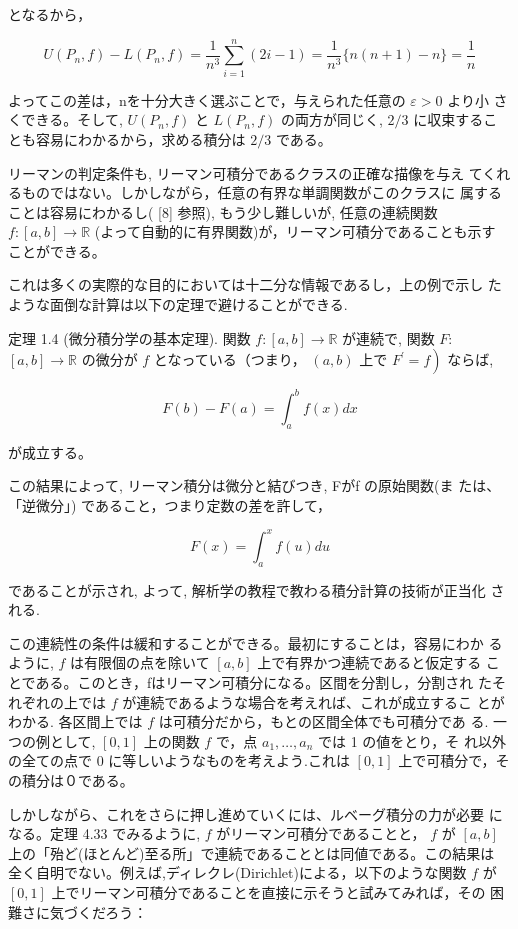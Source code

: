 \documentclass[14pt]{jsarticle}
\begin{document}
となるから，

$$
U\left(P_{n}, f\right)-L\left(P_{n}, f\right)=\frac{1}{n^{3}} \sum_{i=1}^{n}(2 i-1)=\frac{1}{n^{3}}\{n(n+1)-n\}=\frac{1}{n}
$$

よってこの差は，nを十分大きく選ぶことで，与えられた任意の $\varepsilon>0$ より小 さくできる。そして, $U\left(P_{n}, f\right)$ と $L\left(P_{n}, f\right)$ の両方が同じく, $2 / 3$ に収束するこ とも容易にわかるから，求める積分は $2 / 3$ である。

リーマンの判定条件も, リーマン可積分であるクラスの正確な描像を与え てくれるものではない。しかしながら，任意の有界な単調関数がこのクラスに 属することは容易にわかるし( [8] 参照), もう少し難しいが, 任意の連続関数 $f:[a, b] \rightarrow \mathbb{R}$ (よって自動的に有界関数)が，リーマン可積分であることも示す ことができる。

これは多くの実際的な目的においては十二分な情報であるし，上の例で示し たような面倒な計算は以下の定理で避けることができる.

定理 1.4 (微分積分学の基本定理). 関数 $f:[a, b] \rightarrow \mathbb{R}$ が連続で, 関数 $F:$ $[a, b] \rightarrow \mathbb{R}$ の微分が $f$ となっている（つまり， $(a, b)$ 上で $\left.F^{\prime}=f\right)$ ならば,

$$
F(b)-F(a)=\int_{a}^{b} f(x) d x
$$

が成立する。

この結果によって, リーマン積分は微分と結びつき, Fがf の原始関数(ま たは、「逆微分」) であること，つまり定数の差を許して，

$$
F(x)=\int_{a}^{x} f(u) d u
$$

であることが示され, よって, 解析学の教程で教わる積分計算の技術が正当化 される.

この連続性の条件は緩和することができる。最初にすることは，容易にわか るように, $f$ は有限個の点を除いて $[a, b]$ 上で有界かつ連続であると仮定する ことである。このとき，fはリーマン可積分になる。区間を分割し，分割され たそれぞれの上では $f$ が連続であるような場合を考えれば、これが成立するこ とがわかる. 各区間上では $f$ は可積分だから，もとの区間全体でも可積分であ る. 一つの例として, $[0,1]$ 上の関数 $f$ で，点 $a_{1}, \ldots, a_{n}$ では 1 の値をとり，そ れ以外の全ての点で 0 に等しいようなものを考えよう.これは $[0,1]$ 上で可積分で，その積分は０である。

しかしながら、これをさらに押し進めていくには、ルベーグ積分の力が必要 になる。定理 4.33 でみるように, $f$ がリーマン可積分であることと， $f$ が $[a, b]$上の「殆ど(ほとんど)至る所」で連続であることとは同値である。この結果は 全く自明でない。例えば,ディレクレ(Dirichlet)による，以下のような関数 $f$ が $[0,1]$ 上でリーマン可積分であることを直接に示そうと試みてみれば，その 困難さに気づくだろう：
\end{document}

